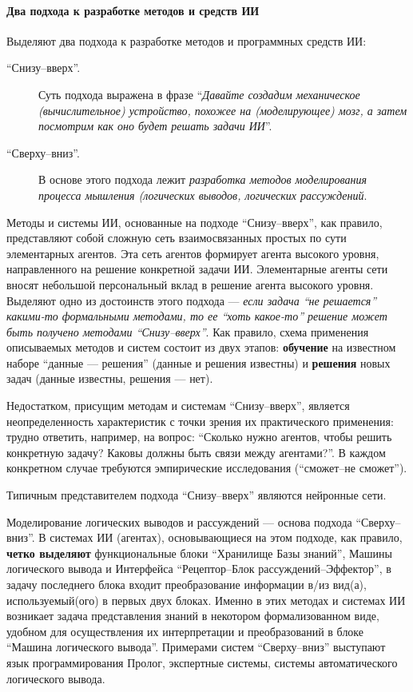 \documentclass[12pt, openany, twoside]{book} %
\def\rem#1{}
\def\AR{{\em Прим.~автора~пособия}}
\newenvironment{mygroup}{}{}
\begin{document}
\paragraph{Два подхода к разработке методов и средств ИИ}
\begin{mygroup}
\small\sf
Выделяют два подхода к разработке методов и программных средств ИИ:
\begin{description}
\item[``Снизу--вверх''.] Суть подхода выражена в фразе ``{\em Давайте создадим механическое (вычислительное) устройство, похожее на (моделирующее) мозг, а затем посмотрим как оно будет решать задачи ИИ}''.
\item[``Сверху--вниз''.] В основе этого подхода лежит {\em разработка методов моделирования процесса мышления (логических выводов, логических рассуждений}.
\end{description}

Методы и системы ИИ, основанные на подходе ``Снизу--вверх'', как правило, представляют собой сложную сеть взаимосвязанных простых по сути элементарных агентов. Эта сеть агентов формирует агента высокого уровня, направленного на решение конкретной задачи ИИ. Элементарные агенты сети вносят небольшой персональный вклад в решение агента высокого уровня. Выделяют одно из достоинств этого подхода --- {\em если задача ``не решается'' какими-то формальными методами, то ее ``хоть какое-то'' решение может быть получено методами ``Снизу--вверх''}. Как правило, схема применения описываемых методов и систем состоит из двух этапов: {\bf обучение} на известном наборе ``данные --- решения'' (данные и решения известны) и {\bf решения} новых задач (данные известны, решения --- нет).

Недостатком, присущим методам и системам ``Снизу--вверх'', является неопределенность характеристик с точки зрения их практического применения: трудно ответить, например, на вопрос: ``Сколько нужно агентов, чтобы решить конкретную задачу? Каковы должны быть связи между агентами?''. В каждом конкретном случае требуются эмпирические исследования (``сможет--не сможет'').

Типичным представителем подхода ``Снизу--вверх'' являются нейронные сети.

Моделирование логических выводов и рассуждений --- основа подхода ``Сверху--вниз''. В системах ИИ (агентах), основывающиеся на этом подходе, как правило, {\bf четко выделяют} функциональные блоки ``Хранилище Базы знаний'', Машины логического вывода и Интерфейса ``Ре\-цеп\-тор--Блок рас\-суж\-де\-ний--Эффек\-тор'', в задачу последнего блока входит преобразование информации в/из вид(а), используемый(ого) в первых двух блоках. Именно в этих методах и системах ИИ возникает задача представления знаний в некотором формализованном виде, удобном для осуществления их интерпретации и преобразований в блоке ``Машина логического вывода''. Примерами\rem{\footnote{Мы не будем анализировать здесь достоинства и недостатки этих методов, т.к. все это будет изложено в пособии. --- \AR.}} систем ``Сверху--вниз'' выступают язык программирования Пролог, экспертные системы, системы автоматического логического вывода.

\end{mygroup}
\end{document}
